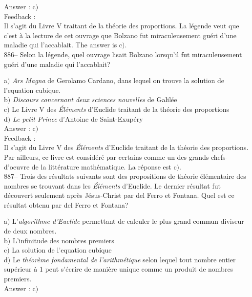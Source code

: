 \documentclass[letterpaper, 12pt]{article}
\begin{document}
Answer : c$)$\\

Feedback :\\
Il s'agit du Livre V traitant de la th\'eorie des proportions.
La l\'egende veut que c'est \`a la lecture de cet ouvrage que Bolzano fut
miraculeusement gu\'eri d'une maladie qui l'accablait. The answer is
c$)$.\\

886-- Selon la l\'egende, quel ouvrage lisait Bolzano lorsqu'il fut
miraculeusement gu\'eri d'une maladie qui l'accablait?

a$)$ {\sl Ars Magna} de Gerolamo Cardano, dans lequel on trouve la solution
de l'equation cubique. \\
b$)$ {\sl Discours concernant deux sciences nouvelles} de Galil\'ee  \\
c$)$ Le Livre V des {\sl \'El\'ements} d'Euclide traitant de la th\'eorie
des proportions \\
d$)$ {\sl Le petit Prince} d'Antoine de Saint-Exup\'ery  \\

Answer : c$)$\\

Feedback :\\
Il s'agit du Livre V des {\sl \'El\'ements} d'Euclide traitant de la
th\'eorie des proportions.
Par ailleurs, ce livre est consid\'er\'e par certains comme un
des grands chefs-d'oeuvre de la litt\'erature math\'ematique. La r\'eponse
est c$)$.\\

887-- Trois des r\'esultats suivants sont des propositions de
th\'eorie \'el\'ementaire des nombres se trouvant dans les {\sl
\'El\'ements} d'Euclide. Le dernier r\'esultat fut d\'ecouvert
seulement apr\`es J\'esus-Christ par del Ferro et Fontana. Quel est
ce r\'esultat obtenu par del Ferro et Fontana?

a$)$ L'{\sl algorithme d'Euclide} permettant de calculer le plus grand
commun diviseur de deux nombres. \\
b$)$ L'infinitude des nombres premiers  \\
c$)$ La solution de l'equation cubique \\
d$)$ Le {\sl th\'eor\`eme fondamental de l'arithm\'etique} selon lequel tout
nombre entier sup\'erieur \`a 1 peut
s'\'ecrire de mani\`ere unique comme un produit de nombres premiers.\\

Answer : c$)$\\
\end{document}
